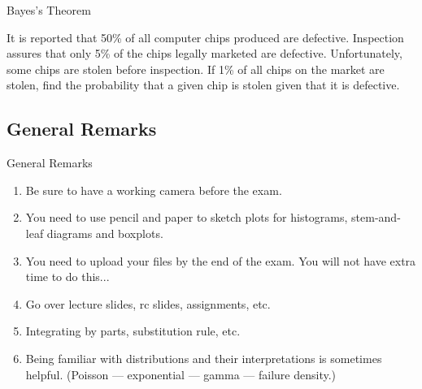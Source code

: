 \begin{frame}{Bayes's Theorem}

\justifying
{} It is reported that 50\% of all computer chips produced are defective. Inspection assures that only 5\% of the chips legally marketed are defective. Unfortunately, some chips are stolen before inspection. If 1\% of all chips on the market are stolen, find the probability that a given chip is stolen given that it is defective.

\end{frame}


\subsection{General Remarks}

\begin{frame}{General Remarks}

\begin{enumerate}
	\justifying
	\item Be sure to have a working camera before the exam.
	\item You need to use pencil and paper to sketch plots for histograms, stem-and-leaf diagrams and boxplots.
	\item You need to upload your files by the end of the exam. You will not have extra time to do this...
	\item Go over lecture slides, rc slides, assignments, etc.
	\item Integrating by parts, substitution rule, etc.
	\item Being familiar with distributions and their interpretations is sometimes helpful. (Poisson --- exponential --- gamma --- failure density.)
\end{enumerate}


\end{frame}

